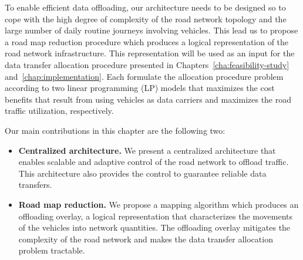 To enable efficient data offloading, our architecture needs to be designed so to cope with the high degree of complexity of the road network topology and the large number of daily routine journeys involving vehicles. This lead us to propose a road map reduction procedure which produces a logical representation of the road network infrastructure. This representation will be used as an input for the data transfer allocation procedure presented in Chapters~\ref{cha:feasibility-study} and~\ref{chap:implementation}. Each formulate the allocation procedure problem according to two linear programming (LP) models that maximizes the cost benefits that result from using vehicles as data carriers and maximizes the road traffic utilization, respectively. 


Our main contributions in this chapter are the following two:
\begin{itemize}

    \item \textbf{Centralized architecture.} We present a centralized architecture that enables scalable and adaptive control of the road network to offload traffic. This architecture also provides the control to guarantee reliable data transfers.
    
    \item \textbf{Road map reduction.} We propose a mapping algorithm which produces an  offloading overlay, a logical representation that characterizes the movements of the vehicles into network quantities. The offloading overlay mitigates the complexity of the road network and makes the data transfer allocation problem tractable.
    
    	
\end{itemize}

